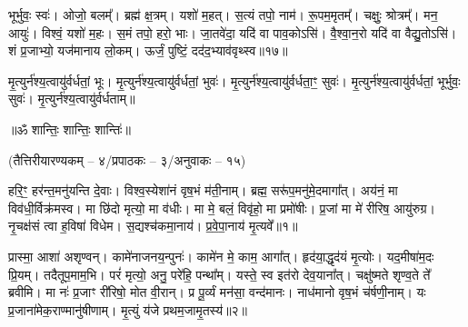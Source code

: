 भूर्भुवः॒ स्वः॑।
ओजो॒ बलम्᳚।
ब्रह्म॑ क्ष॒त्रम्।
यशो॑ म॒हत्।
स॒त्यं तपो॒ नाम॑।
रू॒पम॒मृतम्᳚।
चक्षुः॒ श्रोत्रम्᳚।
मन॒ आयुः॑।
विश्वं॒ यशो॑ म॒हः।
स॒मं तपो॒ हरो॒ भाः।
जा॒तवे॑दा॒ यदि॑ वा पाव॒कोऽसि॑।
वै॒श्वा॒न॒रो यदि॑ वा वैद्यु॒तोऽसि॑।
शं प्र॒जाभ्यो॒ यज॑मानाय लो॒कम्।
ऊर्जं॒ पुष्टिं॒ दद॑द॒भ्याव॑वृथ्स्व॥१७॥
   
मृ॒त्युर्न॑श्य॒त्वायु॑र्वर्धतां॒ भूः।
मृ॒त्युर्न॑श्य॒त्वायु॑र्वर्धतां॒ भुवः॑।
मृ॒त्युर्न॑श्य॒त्वायु॑र्वर्धता॒ꣳ॒ सुवः॑।
मृ॒त्युर्न॑श्य॒त्वायु॑र्वर्धतां॒ भूर्भुवः॒ सुवः॑।
मृ॒त्युर्न॑श्य॒त्वायु॑र्वर्धताम्॥

\centerline{॥ॐ शान्तिः॒ शान्तिः॒ शान्तिः॑॥}
\let\parskip\oldparskip

\closesection
\centerline{\normalsize (तैत्तिरीयारण्यकम् – ४/प्रपाठकः – ३/अनुवाकः – १५)}
हरि॒ꣳ॒ हर॑न्त॒मनु॑यन्ति दे॒वाः। विश्व॒स्येशा॑नं वृष॒भं म॑ती॒नाम्। ब्रह्म॒ सरू॑प॒मनु॑मे॒दमागा᳚त्। अय॑नं॒ मा विव॑धी॒र्विक्र॑मस्व। मा छि॑दो मृत्यो॒ मा व॑धीः। मा मे॒ बलं॒  विवृ॑हो॒ मा प्रमो॑षीः। प्र॒जां मा मे॑ रीरिष॒ आयु॑रुग्र। नृ॒चक्ष॑सं त्वा ह॒विषा॑ विधेम। स॒द्यश्च॑कमा॒नाय॑। प्र॒वे॒पा॒नाय॑ मृ॒त्यवे᳚॥१॥

प्रास्मा॒ आशा॑ अशृण्वन्। कामे॑नाजनय॒न्पुनः॑। कामे॑न मे॒ काम॒ आगा᳚त्। हृद॑या॒द्धृद॑यं मृ॒त्योः। यद॒मीषा॑म॒दः प्रि॒यम्। तदैतूप॒माम॒भि। परं॑ मृत्यो॒ अनु॒ परे॑हि॒ पन्था᳚म्। यस्ते॒ स्व इत॑रो देव॒याना᳚त्। चक्षु॑ष्मते शृण्व॒ते ते᳚ ब्रवीमि। मा नः॑ प्र॒जाꣳ री॑रिषो॒ मोत वी॒रान्। प्र पू॒र्व्यं मन॑सा॒ वन्द॑मानः। नाध॑मानो वृष॒भं च॑र्\mbox{}षणी॒नाम्। यः प्र॒जाना॑मेक॒राण्मानु॑षीणाम्। मृ॒त्युं य॑जे प्रथम॒जामृ॒तस्य॑॥२॥